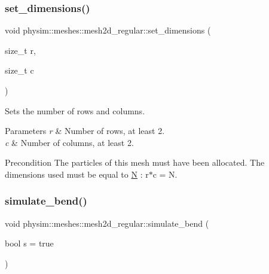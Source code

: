 \mbox{\label{classphysim_1_1meshes_1_1mesh2d__regular_aa8d8eafaea92619a04b3bd1781c8aec7}} 
\subsubsection{\texorpdfstring{set\+\_\+dimensions()}{set\_dimensions()}}
{\footnotesize\ttfamily void physim\+::meshes\+::mesh2d\+\_\+regular\+::set\+\_\+dimensions (\begin{DoxyParamCaption}\item[{size\+\_\+t}]{r,  }\item[{size\+\_\+t}]{c }\end{DoxyParamCaption})}



Sets the number of rows and columns. 


\begin{DoxyParams}{Parameters}
{\em r} & Number of rows, at least 2. \\
\hline
{\em c} & Number of columns, at least 2. \\
\hline
\end{DoxyParams}
\begin{DoxyPrecond}{Precondition}
The particles of this mesh must have been allocated. The dimensions used must be equal to \hyperlink{classphysim_1_1meshes_1_1mesh_a5642217313d7dae9f873f01fad682ff2}{N} \+: r$\ast$c = N. 
\end{DoxyPrecond}
\mbox{\label{classphysim_1_1meshes_1_1mesh2d__regular_abc94712fdb508f126934bd2bde2cf867}} 
\subsubsection{\texorpdfstring{simulate\+\_\+bend()}{simulate\_bend()}}
{\footnotesize\ttfamily void physim\+::meshes\+::mesh2d\+\_\+regular\+::simulate\+\_\+bend (\begin{DoxyParamCaption}\item[{bool}]{s = {\ttfamily true} }\end{DoxyParamCaption})}



